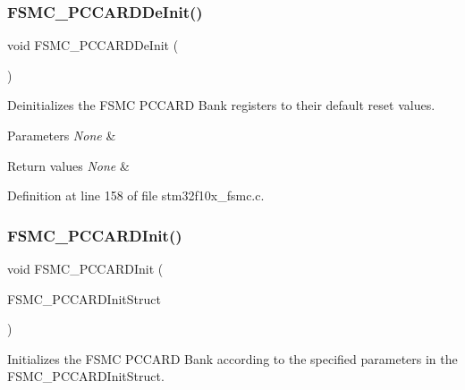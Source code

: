 \subsubsection{\texorpdfstring{F\+S\+M\+C\+\_\+\+P\+C\+C\+A\+R\+D\+De\+Init()}{FSMC\_PCCARDDeInit()}}
{\footnotesize\ttfamily void F\+S\+M\+C\+\_\+\+P\+C\+C\+A\+R\+D\+De\+Init (\begin{DoxyParamCaption}\item[{void}]{ }\end{DoxyParamCaption})}



Deinitializes the F\+S\+MC P\+C\+C\+A\+RD Bank registers to their default reset values. 


\begin{DoxyParams}{Parameters}
{\em None} & \\
\hline
\end{DoxyParams}

\begin{DoxyRetVals}{Return values}
{\em None} & \\
\hline
\end{DoxyRetVals}


Definition at line 158 of file stm32f10x\+\_\+fsmc.\+c.

\mbox{\label{group___f_s_m_c___exported___functions_gacee1351363e7700a296faa1734a910aa}} 
\subsubsection{\texorpdfstring{F\+S\+M\+C\+\_\+\+P\+C\+C\+A\+R\+D\+Init()}{FSMC\_PCCARDInit()}}
{\footnotesize\ttfamily void F\+S\+M\+C\+\_\+\+P\+C\+C\+A\+R\+D\+Init (\begin{DoxyParamCaption}\item[{\hyperlink{struct_f_s_m_c___p_c_c_a_r_d_init_type_def}{F\+S\+M\+C\+\_\+\+P\+C\+C\+A\+R\+D\+Init\+Type\+Def} $\ast$}]{F\+S\+M\+C\+\_\+\+P\+C\+C\+A\+R\+D\+Init\+Struct }\end{DoxyParamCaption})}



Initializes the F\+S\+MC P\+C\+C\+A\+RD Bank according to the specified parameters in the F\+S\+M\+C\+\_\+\+P\+C\+C\+A\+R\+D\+Init\+Struct. 


